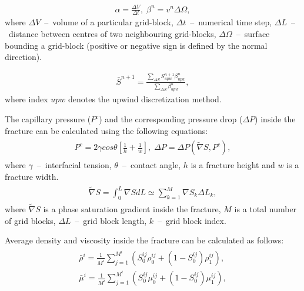 \documentclass[a4paper,12pt]{extreport}
\begin{document}
  \begin{eqnarray}
  \label{eq:twophase_alpha_beta}
  \alpha = \frac{\Delta V}{\Delta t}, \;
  \beta^n = v^n\Delta \Omega,
  \end{eqnarray}
  where $\Delta V$~--~volume of a particular grid-block, $\Delta t$~--~numerical time step, $\Delta L$~--~distance between centres of two neighbouring grid-blocks, $\Delta \Omega$~--~surface bounding a grid-block (positive or negative sign is defined by the normal direction).

\begin{eqnarray}
\label{eq:twophase_delta_num}
\bar{S}^{n+\mathit 1} =\frac{\sum_{\Delta S}S_{upw}^{n+\mathit{1}}\beta^n_{upw}}{\sum_{\Delta S}\beta^n_{upw}},
\end{eqnarray}
 where index $upw$ denotes the upwind discretization method.
 
 The capillary pressure ($P^c$)  and the corresponding pressure drop ($\Delta P$) inside the fracture can be calculated using the following equations:
  \begin{eqnarray}
  \begin{gathered}
  \label{eq:twophase_capillary_pressure_fractures}
  P^{c} = 2 \gamma cos \theta \left[\frac{1}{h} + \frac{1}{w}\right], \; \Delta P = \Delta P \left(\tilde{\nabla} S, P^c\right),
  \end{gathered}
  \end{eqnarray}
  where $\gamma$~--~interfacial tension, $\theta$~--~contact angle, $h$ is a fracture height and $w$ is a fracture width.
  \begin{eqnarray}
  \label{eq:twophase_av_saturation_grad}
  \begin{gathered}
  \tilde{\nabla} S = \int_{0}^{L} \nabla S dL \simeq\sum_{k=1}^{M} \nabla S_{k} \Delta L_{k},
  \end{gathered}
  \end{eqnarray}
 where $\tilde{\nabla} S$ is a phase saturation gradient inside the fracture, $M$ is a total number of grid blocks, $\Delta L$~--~grid block length, $k$~--~grid block index.
 
 
Average density and viscosity inside the fracture can be calculated as follows:
  \begin{eqnarray}
  \label{eq:twophase_dens_visc}
  \begin{gathered}
  \bar{\rho}^i = \frac{1}{M^i}\sum_{j=1}^{M^i} \left(S_0^{ij} \rho^{ij}_0+ \left(1-S_0^{ij}\right) \rho^{ij}_1\right), \\
  \bar{\mu}^i = \frac{1}{M^i}\sum_{j=1}^{M^i} \left(S_0^{ij} \mu^{ij}_0+ \left(1-S_0^{ij}\right) \mu^{ij}_1\right),
  \end{gathered}
  \end{eqnarray}
  
\end{document}
